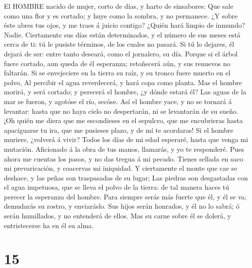  El HOMBRE nacido de mujer, corto de días, y harto de
sinsabores:  Que sale como una flor y es cortado; y huye
como la sombra, y no permanece.  ¿Y sobre éste abres tus
ojos, y me traes á juicio contigo?  ¿Quién hará limpio de
inmundo? Nadie.  Ciertamente sus días están determinados, y
el número de sus meses está cerca de ti: tú le pusiste términos, de los
cuales no pasará.  Si tú lo dejares, él dejará de ser: entre
tanto deseará, como el jornalero, su día.  Porque si el
árbol fuere cortado, aun queda de él esperanza; retoñecerá aún, y sus
renuevos no faltarán.  Si se envejeciere en la tierra su
raíz, y su tronco fuere muerto en el polvo,  Al percibir el
agua reverdecerá, y hará copa como planta.  Mas el hombre
morirá, y será cortado; y perecerá el hombre, ¿y dónde estará él?
 Las aguas de la mar se fueron, y agotóse el río, secóse.
 Así el hombre yace, y no se tornará á levantar: hasta que
no haya cielo no despertarán, ni se levantarán de su sueño.
 ¡Oh quién me diera que me escondieses en el sepulcro, que
me encubrieras hasta apaciguarse tu ira, que me pusieses plazo, y de mí
te acordaras!  Si el hombre muriere, ¿volverá á vivir?
Todos los días de mi edad esperaré, hasta que venga mi mutación.
 Aficionado á la obra de tus manos, llamarás, y yo te
responderé.  Pues ahora me cuentas los pasos, y no das
tregua á mi pecado.  Tienes sellada en saco mi
prevaricación, y coacervas mi iniquidad.  Y ciertamente el
monte que cae se deshace, y las peñas son traspasadas de su lugar;
 Las piedras son desgastadas con el agua impetuosa, que se
lleva el polvo de la tierra: de tal manera haces tú perecer la esperanza
del hombre.  Para siempre serás más fuerte que él, y él se
va; demudarás su rostro, y enviaráslo.  Sus hijos serán
honrados, y él no lo sabrá; ó serán humillados, y no entenderá de ellos.
 Mas su carne sobre él se dolerá, y entristecerse ha en él
su alma.

\hypertarget{section-14}{%
\section{15}\label{section-14}}

